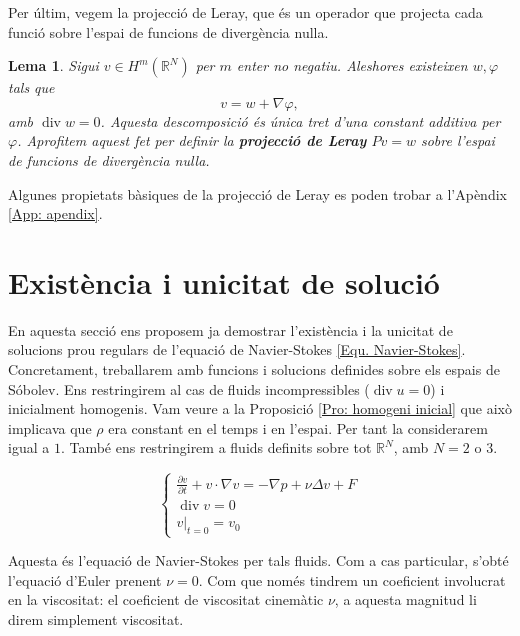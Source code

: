 \documentclass{article}
\numberwithin{equation}{section}
\DeclareMathOperator{\diver}{div}
\newtheorem{lema}{Lema}[section]
\begin{document}
Per \'{u}ltim, vegem la projecci\'{o} de Leray, que \'{e}s un operador que projecta cada funci\'{o} sobre l'espai de funcions de diverg\`{e}ncia nul\textperiodcentered la.

\begin{lema}\label{Lem: Leray original}
Sigui $v\in H^m(\mathbb{R}^N)$ per $m$ enter no negatiu. Aleshores existeixen $w,\varphi$ tals que
\begin{equation}
v=w+\nabla\varphi,
\end{equation}
amb $\diver w=0$. Aquesta descomposici\'{o} \'{e}s \'{u}nica tret d'una constant additiva per $\varphi$. Aprofitem aquest fet per definir la \textbf{projecci\'{o} de Leray} $Pv=w$ sobre l'espai de funcions de diverg\`{e}ncia nul\textperiodcentered la.
\end{lema}

Algunes propietats b\`{a}siques de la projecci\'{o} de Leray es poden trobar a l'Ap\`{e}ndix \ref{App: apendix}.

\section{Exist\`{e}ncia i unicitat de soluci\'{o}}

En aquesta secci\'{o} ens proposem ja demostrar l'exist\`{e}ncia i la unicitat de solucions prou regulars de l'equaci\'{o} de Navier-Stokes \eqref{Equ. Navier-Stokes}. Concretament, treballarem amb funcions i solucions definides sobre els espais de S\'{o}bolev. Ens restringirem al cas de fluids incompressibles ($\diver u=0$) i inicialment homogenis. Vam veure a la Proposici\'{o} \ref{Pro: homogeni inicial} que aix\`{o} implicava que $\rho$ era constant en el temps i en l'espai. Per tant la considerarem igual a $1$. Tamb\'{e} ens restringirem a fluids definits sobre tot $\mathbb{R}^N$, amb $N=2$ o $3$.

\begin{equation}\label{Equ. Navier-Stokes Majda-Bertozzi}
\left\{\begin{array}{l}\displaystyle{\frac{\partial v}{\partial t}+v\cdot\nabla v=-\nabla p+\nu\Delta v+F}\\\diver v=0\\v|_{t=0}=v_0\end{array}\right.
\end{equation}

Aquesta \'{e}s l'equaci\'{o} de Navier-Stokes per tals fluids. Com a cas particular, s'obt\'{e} l'equaci\'{o} d'Euler prenent $\nu=0$. Com que nom\'{e}s tindrem un coeficient involucrat en la viscositat: el coeficient de viscositat cinem\`{a}tic $\nu$, a aquesta magnitud li direm simplement viscositat.
\end{document}
